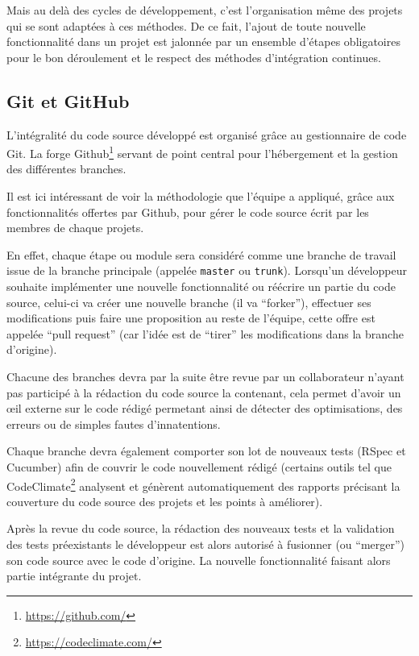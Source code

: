 \documentclass[12pt,a4paper]{book}
\begin{document}
Mais au delà des cycles de développement, c'est l'organisation même des projets qui se sont adaptées à ces méthodes. De ce fait, l'ajout de toute nouvelle fonctionnalité dans un projet est jalonnée par un ensemble d'étapes obligatoires pour le bon déroulement et le respect des méthodes d'intégration continues.

\subsection{Git et GitHub}

\label{sec.git}

L'intégralité du code source développé est organisé grâce au gestionnaire de code Git. La forge Github\footnote{\url{https://github.com/}} servant de point central pour l'hébergement et la gestion des différentes branches.

Il est ici intéressant de voir la méthodologie que l'équipe a appliqué, grâce aux fonctionnalités offertes par Github, pour gérer le code source écrit par les membres de chaque projets.

En effet, chaque étape ou module sera considéré comme une branche de travail issue de la branche principale (appelée \texttt{master} ou \texttt{trunk}). Lorsqu'un développeur souhaite implémenter une nouvelle fonctionnalité ou réécrire un partie du code source, celui-ci va créer une nouvelle branche (il va ``forker''), effectuer ses modifications puis faire une proposition au reste de l'équipe, cette offre est appelée ``pull request'' (car l'idée est de ``tirer'' les modifications dans la branche d'origine).

Chacune des branches devra par la suite être revue par un collaborateur n'ayant pas participé à la rédaction du code source la contenant, cela permet d'avoir un œil externe sur le code rédigé permetant ainsi de détecter des optimisations, des erreurs ou de simples fautes d'innatentions.

Chaque branche devra également comporter son lot de nouveaux tests (RSpec et Cucumber) afin de couvrir le code nouvellement rédigé (certains outils tel que CodeClimate\footnote{\url{https://codeclimate.com/}} analysent et génèrent automatiquement des rapports précisant la couverture du code source des projets et les points à améliorer).

Après la revue du code source, la rédaction des nouveaux tests et la validation des tests préexistants le développeur est alors autorisé à fusionner (ou ``merger'') son code source avec le code d'origine. La nouvelle fonctionnalité faisant alors partie intégrante du projet.
\end{document}

